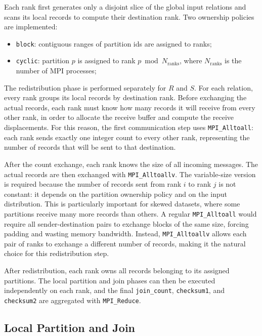 \documentclass[11pt,a4paper]{article}
\begin{document}
Each rank first generates only a disjoint slice of the global input relations and scans its local records to compute their destination rank. Two ownership policies are implemented:
\begin{itemize}
    \item \texttt{block}: contiguous ranges of partition ids are assigned to ranks;
    \item \texttt{cyclic}: partition \(p\) is assigned to rank \(p \bmod N_{\mathrm{ranks}}\), where \(N_{\mathrm{ranks}}\) is the number of MPI processes;
\end{itemize}

The redistribution phase is performed separately for \(R\) and \(S\). For each relation, every rank groups its local records by destination rank. Before exchanging the actual records, each rank must know how many records it will receive from every other rank, in order to allocate the receive buffer and compute the receive displacements. For this reason, the first communication step uses \texttt{MPI\_Alltoall}: each rank sends exactly one integer count to every other rank, representing the number of records that will be sent to that destination.

After the count exchange, each rank knows the size of all incoming messages. The actual records are then exchanged with \texttt{MPI\_Alltoallv}. The variable-size version is required because the number of records sent from rank \(i\) to rank \(j\) is not constant: it depends on the partition ownership policy and on the input distribution. This is particularly important for skewed datasets, where some partitions receive many more records than others. A regular \texttt{MPI\_Alltoall} would require all sender-destination pairs to exchange blocks of the same size, forcing padding and wasting memory bandwidth. Instead, \texttt{MPI\_Alltoallv} allows each pair of ranks to exchange a different number of records, making it the natural choice for this redistribution step.

After redistribution, each rank owns all records belonging to its assigned partitions. The local partition and join phases can then be executed independently on each rank, and the final \texttt{join\_count}, \texttt{checksum1}, and \texttt{checksum2} are aggregated with \texttt{MPI\_Reduce}.

\subsection{Local Partition and Join}
\end{document}
